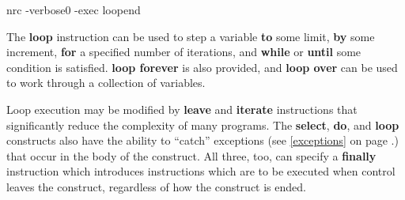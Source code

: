 \begin{shaded}
\bash[stdout]
nrc -verbose0 -exec loopend
\END
\end{shaded}

The \textbf{loop} instruction can be used to step a variable
\textbf{to} some limit, \textbf{by} some increment, \textbf{for} a
specified number of iterations, and \textbf{while} or \textbf{until}
some condition is satisfied. \textbf{loop forever} is also provided,
and \textbf{loop over} can be used to work through a collection of
variables.

Loop execution may be modified by \textbf{leave} and \textbf{iterate} instructions that significantly reduce the complexity of many programs.
The \textbf{select}, \textbf{do}, and \textbf{loop} constructs also have the ability to “catch”
exceptions (see \ref{exceptions} on page \pageref{exceptions}.) that occur in the body of the construct. All
three, too, can specify a \textbf{finally} instruction which introduces
instructions which are to be executed when control leaves the
construct, regardless of how the construct is ended.


